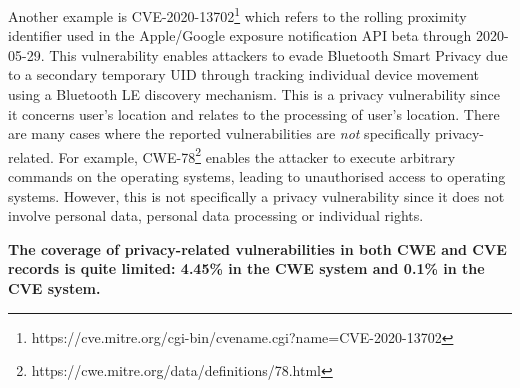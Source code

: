 Another example is CVE-2020-13702\footnote{https://cve.mitre.org/cgi-bin/cvename.cgi?name=CVE-2020-13702} which refers to the rolling proximity identifier used in the Apple/Google exposure notification API beta through 2020-05-29. This vulnerability enables attackers to evade Bluetooth Smart Privacy due to a secondary temporary UID through tracking individual device movement using a Bluetooth LE discovery mechanism. This is a privacy vulnerability since it concerns user's location and relates to the processing of user's location. There are many cases where the reported vulnerabilities are \emph{not} specifically privacy-related. For example, CWE-78\footnote{https://cwe.mitre.org/data/definitions/78.html} enables the attacker to execute arbitrary commands on the operating systems, leading to unauthorised access to operating systems. However, this is not specifically a privacy vulnerability since it does not involve personal data, personal data processing or individual rights. 




\begin{conclusion}
	\textbf{The coverage of privacy-related vulnerabilities in both CWE and CVE records is quite limited: 4.45\% in the CWE system and 0.1\% in the CVE system.}
\end{conclusion}